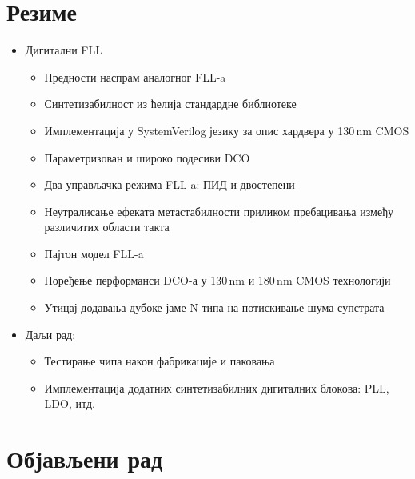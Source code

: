 \documentclass[aspectratio=169]{beamer}
\def \FLL  {FLL} %
\def \DCO  {DCO} %
\begin{document}
\section{Резиме}
\begin{frame}{\secname}
	\begin{itemize}
	    \item Дигитални \FLL\ 
	        \begin{itemize}
		        \item Предности наспрам аналогног \FLL-a
      	        	\item Синтетизабилност из ћелија стандардне библиотеке
      	        	\item Имплементација у SystemVerilog језику за опис хардвера у 130\,nm CMOS
      	        	\item Параметризован и широко подесиви \DCO\
      	        	\item Два управљачка режима \FLL-a: ПИД и двостепени
      	        	\item Неутралисање ефеката метастабилности приликом пребацивања између различитих области такта
			\item Пајтон модел \FLL-a
			\item Поређење перформанси \DCO-а у 130\,nm и 180\,nm CMOS технологији
			\item Утицај додавања дубоке јаме N типа на потискивање шума супстрата
            	\end{itemize}
	    \bigskip
	    \item Даљи рад:
	        \begin{itemize}
	             \item Тестирање чипа након фабрикације и паковања
	             \item Имплементација додатних синтетизабилних дигиталних блокова: PLL, LDO, итд.
	        \end{itemize}        
	\end{itemize}
\end{frame}

\section{Објављени рад}
\end{document}
